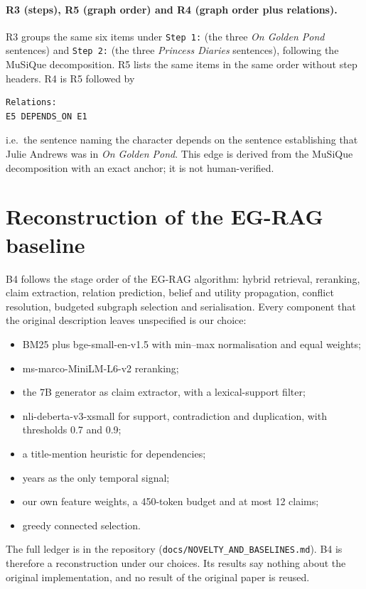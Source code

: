 \paragraph{R3 (steps), R5 (graph order) and R4 (graph order plus relations).}
R3 groups the same six items under \texttt{Step 1:} (the three \emph{On Golden Pond} sentences) and \texttt{Step 2:} (the three \emph{Princess Diaries} sentences), following the MuSiQue decomposition. R5 lists the same items in the same order without step headers. R4 is R5 followed by
\begin{footnotesize}
\begin{verbatim}
Relations:
E5 DEPENDS_ON E1
\end{verbatim}
\end{footnotesize}
\noindent i.e.\ the sentence naming the character depends on the sentence establishing that Julie Andrews was in \emph{On Golden Pond}. This edge is derived from the MuSiQue decomposition with an exact anchor; it is not human-verified.

\section{Reconstruction of the EG-RAG baseline}
\label{app:reconstruction}

B4 follows the stage order of the EG-RAG algorithm: hybrid retrieval, reranking, claim extraction, relation prediction, belief and utility propagation, conflict resolution, budgeted subgraph selection and serialisation. Every component that the original description leaves unspecified is our choice:
\begin{itemize}
\item BM25 plus bge-small-en-v1.5 with min--max normalisation and equal weights;
\item ms-marco-MiniLM-L6-v2 reranking;
\item the 7B generator as claim extractor, with a lexical-support filter;
\item nli-deberta-v3-xsmall for support, contradiction and duplication, with thresholds 0.7 and 0.9;
\item a title-mention heuristic for dependencies;
\item years as the only temporal signal;
\item our own feature weights, a 450-token budget and at most 12 claims;
\item greedy connected selection.
\end{itemize}
The full ledger is in the repository (\texttt{docs/NOVELTY\_AND\_BASELINES.md}). B4 is therefore a reconstruction under our choices. Its results say nothing about the original implementation, and no result of the original paper is reused.

